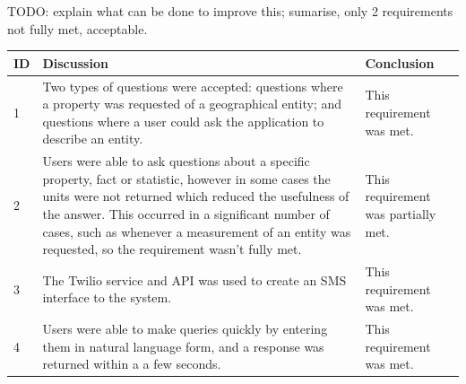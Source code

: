 \documentclass[authoryearcitations]{UoYCSproject}
\begin{document}

TODO: explain what can be done to improve this; sumarise, only 2 requirements not fully met, acceptable.

\begin{table}[h]
\begin{tabular}{|p{0.4cm}|p{9.0cm}|p{4.0cm}|}
\hline
ID & Discussion                                                                                                                                                                                                                                                                                                                                                                                                                                & Conclusion                          \\ \hline
1  & Two types of questions were accepted: questions where a property was requested of a geographical entity; and questions where a user could ask the application to describe an entity.                                                                                                                                                                                                                                                      & This requirement was met.           \\ \hline
2  & Users were able to ask questions about a specific property, fact or statistic, however in some cases the units were not returned which reduced the usefulness of the answer. This occurred in a significant number of cases, such as whenever a measurement of an entity was requested, so the requirement wasn't fully met.                                                                                                              & This requirement was partially met. \\ \hline
3  & The Twilio service and API was used to create an SMS interface to the system.                                                                                                                                                                                                                                                                                                                                                             & This requirement was met.           \\ \hline
4  & Users were able to make queries quickly by entering them in natural language form, and a response was returned within a a few seconds.                                                                                                                                                                                                                                                                                                    & This requirement was met.           \\ \hline

\end{tabular}
\end{table}
\end{document}
